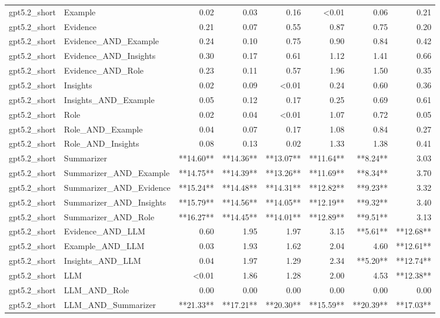 \begin{tabular}{llrrrrrr}
gpt5.2_short & Example & 0.02 & 0.03 & 0.16 & <0.01 & 0.06 & 0.21 \\
gpt5.2_short & Evidence & 0.21 & 0.07 & 0.55 & 0.87 & 0.75 & 0.20 \\
gpt5.2_short & Evidence_AND_Example & 0.24 & 0.10 & 0.75 & 0.90 & 0.84 & 0.42 \\
gpt5.2_short & Evidence_AND_Insights & 0.30 & 0.17 & 0.61 & 1.12 & 1.41 & 0.66 \\
gpt5.2_short & Evidence_AND_Role & 0.23 & 0.11 & 0.57 & 1.96 & 1.50 & 0.35 \\
gpt5.2_short & Insights & 0.02 & 0.09 & <0.01 & 0.24 & 0.60 & 0.36 \\
gpt5.2_short & Insights_AND_Example & 0.05 & 0.12 & 0.17 & 0.25 & 0.69 & 0.61 \\
gpt5.2_short & Role & 0.02 & 0.04 & <0.01 & 1.07 & 0.72 & 0.05 \\
gpt5.2_short & Role_AND_Example & 0.04 & 0.07 & 0.17 & 1.08 & 0.84 & 0.27 \\
gpt5.2_short & Role_AND_Insights & 0.08 & 0.13 & 0.02 & 1.33 & 1.38 & 0.41 \\
gpt5.2_short & Summarizer & **14.60** & **14.36** & **13.07** & **11.64** & **8.24** & 3.03 \\
gpt5.2_short & Summarizer_AND_Example & **14.75** & **14.39** & **13.26** & **11.69** & **8.34** & 3.70 \\
gpt5.2_short & Summarizer_AND_Evidence & **15.24** & **14.48** & **14.31** & **12.82** & **9.23** & 3.32 \\
gpt5.2_short & Summarizer_AND_Insights & **15.79** & **14.56** & **14.05** & **12.19** & **9.32** & 3.40 \\
gpt5.2_short & Summarizer_AND_Role & **16.27** & **14.45** & **14.01** & **12.89** & **9.51** & 3.13 \\
gpt5.2_short & Evidence_AND_LLM & 0.60 & 1.95 & 1.97 & 3.15 & **5.61** & **12.68** \\
gpt5.2_short & Example_AND_LLM & 0.03 & 1.93 & 1.62 & 2.04 & 4.60 & **12.61** \\
gpt5.2_short & Insights_AND_LLM & 0.04 & 1.97 & 1.29 & 2.34 & **5.20** & **12.74** \\
gpt5.2_short & LLM & <0.01 & 1.86 & 1.28 & 2.00 & 4.53 & **12.38** \\
gpt5.2_short & LLM_AND_Role & 0.00 & 0.00 & 0.00 & 0.00 & 0.00 & 0.00 \\
gpt5.2_short & LLM_AND_Summarizer & **21.33** & **17.21** & **20.30** & **15.59** & **20.39** & **17.03** \\

\end{tabular}
